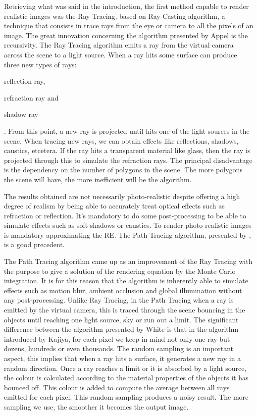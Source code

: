 \documentclass[titlepage,12pt]{report}
\begin{document}
Retrieving what was said in the introduction, the first method capable to render realistic images was the Ray Tracing, based on Ray Casting algorithm, a technique that consists in trace rays from the eye or camera to all the pixels of an image. The great innovation concerning the algorithm presented by Appel is the recursivity. The Ray Tracing algorithm emits a ray from the virtual camera across the scene to a light source. When a ray hits some surface can produce three new types of rays: \begin{enumerate*}[label=\roman*)] \item reflection ray\label{ray:reflected}, \item refraction ray and \item shadow ray\end{enumerate*}. From this point, a new ray is projected until hits one of the light sources in the scene. When tracing new rays, we can obtain effects like reflections, shadows, caustics, etcetera. If the ray hits a transparent material like glass, then the ray is projected through this to simulate the refraction rays. The principal disadvantage is the dependency on the number of polygons in the scene. The more polygons the scene will have, the more inefficient will be the algorithm.

The results obtained are not necessarily photo-realistic despite offering a high degree of realism by being able to accurately treat optical effects such as refraction or reflection. It's mandatory to do some post-processing to be able to simulate effects such as soft shadows or caustics. To render photo-realistic images is mandatory approximating the RE. The Path Tracing algorithm, presented by \citep[pp. ~143--150]{Kajiya1986}, is a good precedent.

The Path Tracing algorithm came up as an improvement of the Ray Tracing with the purpose to give a solution of the rendering equation by the Monte Carlo integration. It is for this reason that the algorithm is inherently able to simulate effects such as motion blur, ambient occlusion and global illumination without any post-processing. Unlike Ray Tracing, in the Path Tracing when a ray is emitted by the virtual camera, this is traced through the scene bouncing in the objects until reaching one light source, sky or run out a limit. The significant difference between the algorithm presented by White is that in the algorithm introduced by Kajiya, for each pixel we keep in mind not only one ray but dozens, hundreds or even thousands. The random sampling is an important aspect, this implies that when a  ray hits a surface, it generates a new ray in a random direction. Once a ray reaches a limit or it is absorbed by a light source, the colour is calculated according to the material properties of the objects it has bounced off. This colour is added to compute the average between all rays emitted for each pixel. This random sampling produces a noisy result. The more sampling we use, the smoother it becomes the output image.
\end{document}
